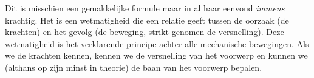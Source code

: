 \documentclass{ximera}
\begin{document}
	Dit is misschien een gemakkelijke formule maar in al haar eenvoud \emph{immens} krachtig. Het is een wetmatigheid die een relatie geeft tussen de oorzaak (de krachten) en het gevolg (de beweging, strikt genomen de versnelling). Deze wetmatigheid is het verklarende principe achter alle mechanische bewegingen. Als we de krachten kennen, kennen we de versnelling van het voorwerp en kunnen we (althans op zijn minst in theorie) de baan van het voorwerp bepalen.
	
	
	
	
	
\end{document}
